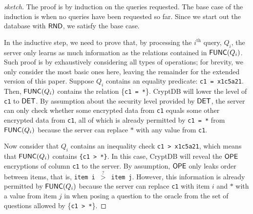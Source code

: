 \begin{proof}[sketch]
The proof is by induction on
the queries requested. The base case of the
induction is when no queries have been requested so far. Since we start out the
database with $\mathsf{RND}$, we satisfy the base case. 

In the inductive
step, we need to prove that, by processing the $i^\mathrm{th}$ query, $Q_i$, the server
only learns as much information as the relations contained in $\mathsf{FUNC}(Q_i)$. Such proof is by
exhaustively considering all types of operations; for
brevity, we only consider the most basic ones here, leaving the remainder for
the extended version of this paper.
Suppose $Q_i$ contains an equality predicate:
\texttt{c1 = x1c5a21}. Then,  $\mathsf{FUNC}(Q_i)$ contains the relation \{\texttt{c1 =
*}\}. CryptDB will lower the level of {\tt c1} to $\mathsf{DET}$\@.
By assumption about the security level provided by $\mathsf{DET}$, the server
can only check whether some encrypted data from {\tt c1} equals some
other encrypted data from {\tt c1}, all of which is already permitted by
\texttt{c1 = *} from $\mathsf{FUNC}(Q_i)$ because the server can replace $*$ with any
value from {\tt c1}.

Now consider that $Q_i$ contains an inequality check \texttt{c1 > x1c5a21},
which means that $\mathsf{FUNC}(Q_i)$ contains \texttt{\{c1 > *\}}. In this case, CryptDB
will reveal the $\mathsf{OPE}$ encryptions of column {\tt c1} to the server.  By assumption,
$\mathsf{OPE}$ only leaks order between items, that is, {\tt item i $\stackrel{?}{>}$
item j}.  However, this information is already permitted by $\mathsf{FUNC}(Q_i)$ because
the server can replace {\tt c1} with item $i$ and $*$ with a value from item
$j$ in when posing a question to the oracle from the set of questions allowed by
\{{\tt c1 > *}\}. 
\end{proof}

